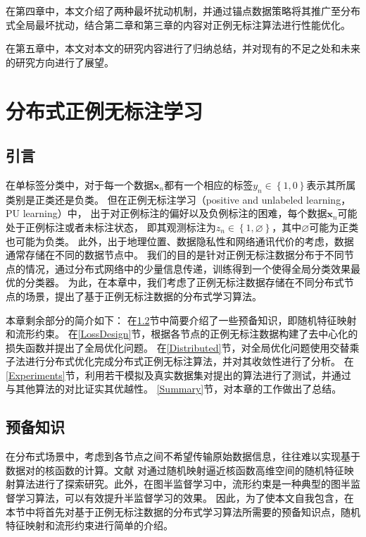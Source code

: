 在第四章中，本文介绍了两种最坏扰动机制，并通过锚点数据策略将其推广至分布式全局最坏扰动，结合第二章和第三章的内容对正例无标注算法进行性能优化。

在第五章中，本文对本文的研究内容进行了归纳总结，并对现有的不足之处和未来的研究方向进行了展望。


\chapter{分布式正例无标注学习}
\section{引言}\label{Char2_Pre}
{在单标签分类中，对于每一个数据$\boldsymbol x_n$都有一个相应的标签$y_n\in\left\{1,0\right\}$表示其所属类别是正类还是负类。
但在正例无标注学习（positive and unlabeled learning，PU learning）中，
出于对正例标注的偏好以及负例标注的困难，每个数据$\boldsymbol x_n$可能处于正例标注或者未标注状态，}
即其观测标注为$z_n\in\left\{1,\varnothing\right\}$，其中$\varnothing$可能为正类也可能为负类。
{此外，出于地理位置、数据隐私性和网络通讯代价的考虑，数据通常存储在不同的数据节点中。}
我们的目的是针对正例无标注数据分布于不同节点的情况，通过分布式网络中的少量信息传递，训练得到一个使得全局分类效果最优的分类器。
{为此，在本章中，我们考虑了正例无标注数据存储在不同分布式节点的场景，提出了基于正例无标注数据的分布式学习算法。}

本章剩余部分的简介如下：
在\ref{Preliminaries}节中简要介绍了一些预备知识，即随机特征映射和流形约束。
在\ref{LossDesign}节，根据各节点的正例无标注数据构建了去中心化的损失函数并提出了全局优化问题。
{在\ref{Distributed}节，对全局优化问题使用交替乘子法进行分布式优化完成分布式正例无标注算法，并对其收敛性进行了分析。}
在\ref{Experiments}节，利用若干模拟及真实数据集对提出的算法进行了测试，并通过与其他算法的对比证实其优越性。
\ref{Summary}节，对本章的工作做出了总结。

\section{预备知识}\label{Preliminaries}
在分布式场景中，考虑到各节点之间不希望传输原始数据信息，往往难以实现基于数据对的核函数的计算。文献\parencite{Yuan_Efficient_2015,Vedaldi_Efficient_2012,Vempati_Generalized_2010}
对通过随机映射逼近核函数高维空间的随机特征映射算法进行了探索研究。此外，在图半监督学习中，流形约束是一种典型的图半监督学习算法，可以有效提升半监督学习的效果\cite{Van_SemiSurvey_2020, Dong_Semi_2016}。
因此，为了使本文自我包含，在本节中将首先对基于正例无标注数据的分布式学习算法所需要的预备知识点，随机特征映射和流形约束进行简单的介绍。

